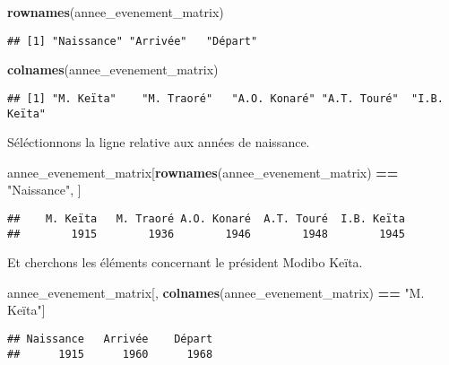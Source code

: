 \documentclass[]{book}
\newenvironment{Shaded}{\begin{snugshade}}{\end{snugshade}}
\newcommand{\KeywordTok}[1]{\textcolor[rgb]{0.13,0.29,0.53}{\textbf{#1}}}
\newcommand{\StringTok}[1]{\textcolor[rgb]{0.31,0.60,0.02}{#1}}
\newcommand{\OperatorTok}[1]{\textcolor[rgb]{0.81,0.36,0.00}{\textbf{#1}}}
\newcommand{\NormalTok}[1]{#1}
\begin{document}
\begin{Shaded}
\begin{Highlighting}[]
\KeywordTok{rownames}\NormalTok{(annee_evenement_matrix)}
\end{Highlighting}
\end{Shaded}

\begin{verbatim}
## [1] "Naissance" "Arrivée"   "Départ"
\end{verbatim}

\begin{Shaded}
\begin{Highlighting}[]
\KeywordTok{colnames}\NormalTok{(annee_evenement_matrix)}
\end{Highlighting}
\end{Shaded}

\begin{verbatim}
## [1] "M. Keïta"    "M. Traoré"   "A.O. Konaré" "A.T. Touré"  "I.B. Keïta"
\end{verbatim}

Séléctionnons la ligne relative aux années de naissance.

\begin{Shaded}
\begin{Highlighting}[]
\NormalTok{annee_evenement_matrix[}\KeywordTok{rownames}\NormalTok{(annee_evenement_matrix) }\OperatorTok{==}\StringTok{ "Naissance"}\NormalTok{, ]}
\end{Highlighting}
\end{Shaded}

\begin{verbatim}
##    M. Keïta   M. Traoré A.O. Konaré  A.T. Touré  I.B. Keïta 
##        1915        1936        1946        1948        1945
\end{verbatim}

Et cherchons les éléments concernant le président Modibo Keïta.

\begin{Shaded}
\begin{Highlighting}[]
\NormalTok{annee_evenement_matrix[, }\KeywordTok{colnames}\NormalTok{(annee_evenement_matrix) }\OperatorTok{==}\StringTok{ "M. Keïta"}\NormalTok{]}
\end{Highlighting}
\end{Shaded}

\begin{verbatim}
## Naissance   Arrivée    Départ 
##      1915      1960      1968
\end{verbatim}
\end{document}
